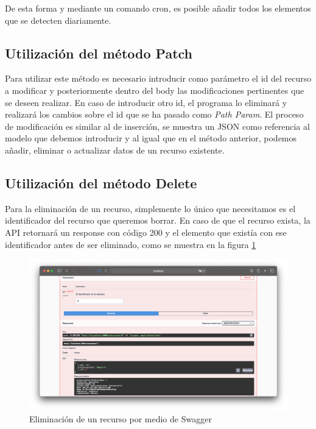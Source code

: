 De esta forma y mediante un comando cron, es posible añadir todos los elementos que se detecten diariamente.

\subsection{Utilización del método Patch}

Para utilizar este método es necesario introducir como parámetro el id del recurso a modificar y posteriormente dentro del body las modificaciones pertinentes que se deseen realizar. En caso de introducir otro id, el programa lo eliminará y realizará los cambios sobre el id que se ha pasado como \textit{Path Param}. El proceso de modificación es similar al de inserción, se muestra un JSON como referencia al modelo que debemos introducir y al igual que en el método anterior, podemos añadir, eliminar o actualizar datos de un recurso existente.

\subsection{Utilización del método Delete}

Para la eliminación de un recurso, simplemente lo único que necesitamos es el identificador del recurso que queremos borrar. En caso de que el recurso exista, la API retornará un response con código 200 y el elemento que existía con ese identificador antes de ser eliminado, como se muestra en la figura \ref{fig:swagger_delete}

\begin{figure}[H]
    \centering
    \includegraphics[width=\textwidth]{include/resultados/SwaggerDelete.png}
    \caption{Eliminación de un recurso por medio de Swagger}
    \label{fig:swagger_delete}
\end{figure}


